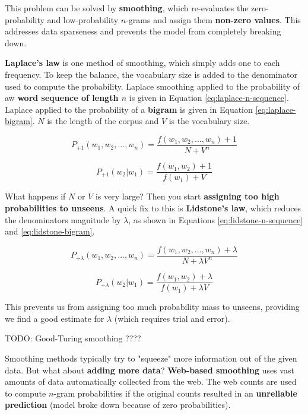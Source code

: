 \documentclass{article}
\begin{document}
This problem can be solved by \textbf{smoothing}, which re-evaluates the zero-probability and low-probability $n$-grams and assign them \textbf{non-zero values}. This addresses data sparseness and prevents the model from completely breaking down.

\textbf{Laplace's law} is one method of smoothing, which simply adds one to each frequency. To keep the balance, the vocabulary size is added to the denominator used to compute the probability. Laplace smoothing applied to the probability of aw \textbf{word sequence of length $n$} is given in Equation \ref{eq:laplace-n-sequence}. Laplace applied to the probability of a \textbf{bigram} is given in Equation \ref{eq:laplace-bigram}. $N$ is the length of the corpus and $V$ is the vocabulary size.

\begin{equation}
	P_{+1}(w_1,w_2,...,w_n) = \frac{f(w_1,w_2,...,w_n) + 1}{N + V^{n}}
	\label{eq:laplace-n-sequence}
\end{equation}

\begin{equation}
	P_{+1}(w_2|w_1) = \frac{f(w_1,w_2) + 1}{f(w_1) + V}
	\label{eq:laplace-bigram}
\end{equation}

What happens if $N$ or $V$ is very large? Then you start \textbf{assigning too high probabilities to unseens}. A quick fix to this is \textbf{Lidstone's law}, which reduces the denominators magnitude by $\lambda$, as shown in Equations \ref{eq:lidstone-n-sequence} and \ref{eq:lidstone-bigram}.

\begin{equation}
	P_{+\lambda}(w_1,w_2,...,w_n) = \frac{f(w_1,w_2,...,w_n) + \lambda}{N + \lambda V^{n}}
	\label{eq:lidstone-n-sequence}
\end{equation}

\begin{equation}
	P_{+\lambda}(w_2|w_1) = \frac{f(w_1,w_2) + \lambda}{f(w_1) + \lambda V}
	\label{eq:lidstone-bigram}
\end{equation}

This prevents us from assigning too much probability mass to unseens, providing we find a good estimate for $\lambda$ (which requires trial and error).

TODO: Good-Turing smoothing
????

Smoothing methods typically try to "squeeze" more information out of the given data. But what about  \textbf{adding more data}? \textbf{Web-based smoothing} uses vast amounts of data automatically collected from the web. The web counts are used to compute $n$-gram probabilities if the original counts resulted in an \textbf{unreliable prediction} (model broke down because of zero probabilities).
\end{document}
